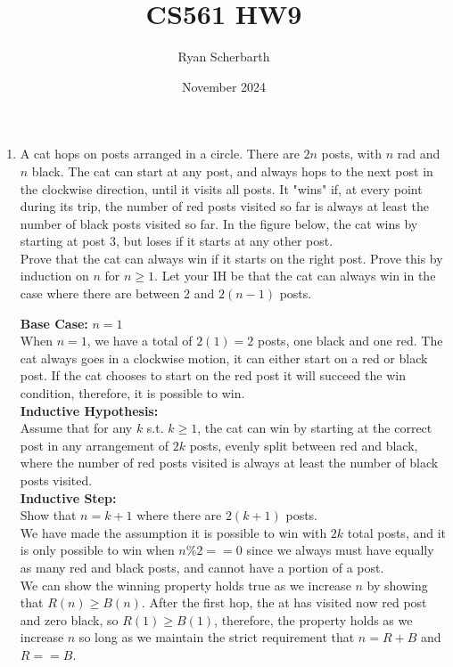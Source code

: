 \documentclass{article}
\title{CS561 HW9}
\author{Ryan Scherbarth}
\date{November 2024}
\begin{document}
\maketitle

\begin{enumerate}
\item A cat hops on posts arranged in a circle. There are $2n$ posts, with $n$ rad and $n$ black. The cat can start at any post, and always hops to the next post in the clockwise direction, until it visits all posts. It "wins" if, at every point during its trip, the number of red posts visited so far is always at least the number of black posts visited so far. In the figure below, the cat wins by starting at post 3, but loses if it starts at any other post. \\
Prove that the cat can always win if it starts on the right post. Prove this by induction on $n$ for $n \geq 1$. Let your IH be that the cat can always win in the case where there are between 2 and $2(n-1)$ posts. \\
\newline

\textbf{Base Case:} $n=1$ \\
When $n=1$, we have a total of $2(1) = 2$ posts, one black and one red. The cat always goes in a clockwise motion, it can either start on a red or black post. If the cat chooses to start on the red post it will succeed the win condition, therefore, it is possible to win. \\

\textbf{Inductive Hypothesis:} \\
Assume that for any $k$ s.t. $k \geq 1$, the cat can win by starting at the correct post in any arrangement of $2k$ posts, evenly split between red and black, where the number of red posts visited is always at least the number of black posts visited. \\

\textbf{Inductive Step:} \\
Show that $n = k + 1$ where there are $2(k+1)$ posts. \\
We have made the assumption it is possible to win with $2k$ total posts, and it is only possible to win when $n \% 2 == 0$ since we always must have equally as many red and black posts, and cannot have a portion of a post. \\
We can show the winning property holds true as we increase $n$ by showing that $R(n) \geq B(n)$. After the first hop, the at has visited now red post and zero black, so $R(1) \geq B(1)$, therefore, the property holds as we increase $n$ so long as we maintain the strict requirement that $n = R + B$ and $R == B$. \\
\newline








\end{enumerate}
\end{document}
